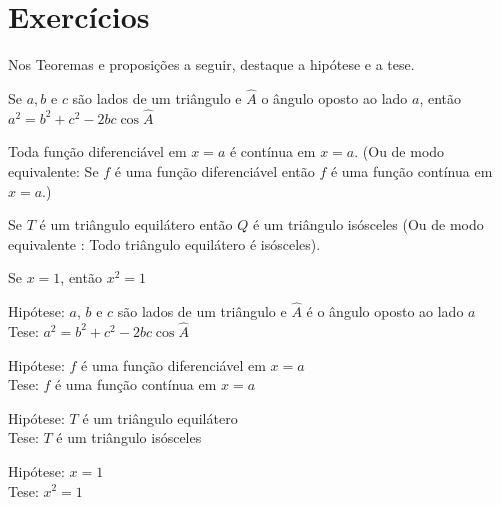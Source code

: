 \section{Exercícios}

\begin{exercises*}

\begin{exercise}
  Nos Teoremas e proposições a seguir, destaque a hipótese e a tese.
  \begin{alphalist}
    \item Se $a,b$ e $c$ são lados de um triângulo e $\hat{A}$ o ângulo
      oposto ao lado $a$, então $a^2 = b^2 + c^2 - 2bc \cos \hat{A}$
    \item Toda função diferenciável em $x=a$ é contínua em $x=a$. (Ou de
      modo equivalente: Se $f$ é uma função diferenciável então $f$ é uma
      função contínua em $x=a$.)
    \item Se $T$ é um triângulo equilátero então $Q$ é um triângulo
      isósceles (Ou de modo equivalente : Todo triângulo equilátero é
      isósceles).
    \item Se $x=1$, então $x^2=1$
  \end{alphalist}

  \begin{answer}
    \begin{alphalist}
      \item Hipótese: $a$, $b$ e $c$ são lados de um triângulo e $\hat{A}$
            é o ângulo oposto ao lado $a$ \\
            Tese: $a^2 = b^2 + c^2 - 2bc \cos \hat{A}$
      \item Hipótese: $f$ é uma função diferenciável em $x=a$ \\
            Tese: $f$ é uma função contínua em $x=a$
      \item Hipótese: $T$ é um triângulo equilátero \\
            Tese: $T$ é um triângulo isósceles
      \item Hipótese: $x=1$ \\
            Tese: $x^2=1$
    \end{alphalist}
  \end{answer}
\end{exercise}


\end{exercises*}
